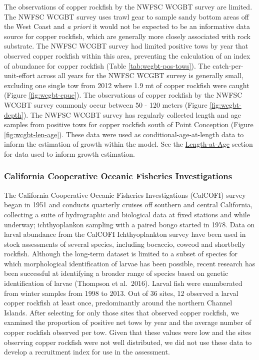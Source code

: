 \documentclass[11pt,
  english,
  letterpaper,
]{article}
\begin{document}
The observations of copper rockfish by the NWFSC WCGBT survey are limited. The NWFSC WCGBT survey uses trawl gear to sample sandy bottom areas off the West Coast and \emph{a priori} it would not be expected to be an informative data source for copper rockfish, which are generally more closely associated with rock substrate. The NWFSC WCGBT survey had limited positive tows by year that observed copper rockfish within this area, preventing the calculation of an index of abundance for copper rockfish (Table \ref{tab:wcgbt-pos-tows}). The catch-per-unit-effort across all years for the NWFSC WCGBT survey is generally small, excluding one single tow from 2012 where 1.9 mt of copper rockfish were caught (Figure \ref{fig:wcgbt-cpue}). The observations of copper rockfish by the NWFSC WCGBT survey commonly occur between 50 - 120 meters (Figure \ref{fig:wcgbt-depth}). The NWFSC WCGBT survey has regularly collected length and age samples from positive tows for copper rockfish south of Point Conception (Figure \ref{fig:wcgbt-len-age}). These data were used as conditional-age-at-length data to inform the estimation of growth within the model. See the \protect\hyperlink{length-at-age}{Length-at-Age} section for data used to inform growth estimation.

\hypertarget{california-cooperative-oceanic-fisheries-investigations}{%
\subsubsection{California Cooperative Oceanic Fisheries Investigations}\label{california-cooperative-oceanic-fisheries-investigations}}

The California Cooperative Oceanic Fisheries Investigations (CalCOFI) survey began in 1951 and conducts quarterly cruises off southern and central California, collecting a suite of hydrographic and biological data at fixed stations and while underway; ichthyoplankon sampling with a paired bongo started in 1978. Data on larval abundance from the CalCOFI Ichthyoplankton survey have been used in stock assessments of several species, including bocaccio, cowcod and shortbelly rockfish. Although the long-term dataset is limited to a subset of species for which morphological identification of larvae has been possible, recent research has been successful at identifying a broader range of species based on genetic identification of larvae (Thompson et al.~2016). Larval fish were enumberated from winter samples from 1998 to 2013. Out of 36 sites, 12 observed a larval copper rockfish at least once, predominantly around the northern Channel Islands. After selecting for only those sites that observed copper rockfish, we examined the proportion of positive net tows by year and the average number of copper rockfish observed per tow. Given that these values were low and the sites observing copper rockfish were not well distributed, we did not use these data to develop a recruitment index for use in the assessment.
\end{document}
